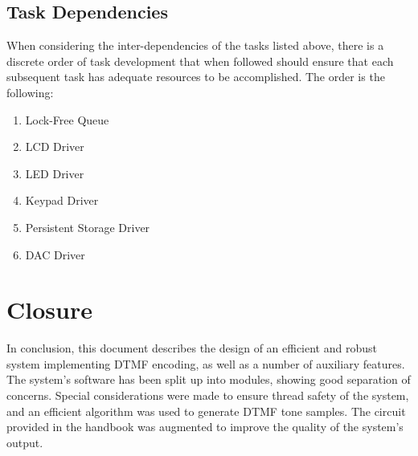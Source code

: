 \documentclass[11pt,a4paper,twocolumn]{scrartcl}
\begin{document}
\subsection{Task Dependencies}
When considering the inter-dependencies of the tasks listed above, there is a discrete order of task development that when followed should ensure that each subsequent task has adequate resources to be accomplished. The order is the following:
\begin{enumerate}
    \item Lock-Free Queue
    \item LCD Driver
   \item LED Driver
   \item Keypad Driver
   \item Persistent Storage Driver
   \item DAC Driver
\end{enumerate}

\section{Closure}

In conclusion, this document describes the design of an efficient and robust system implementing DTMF encoding, as well as a number of auxiliary features. The system's software has been split up
into modules, showing good separation of concerns. Special considerations were made to ensure thread safety of the system, and an efficient algorithm was used to generate DTMF tone samples. The circuit provided in the handbook was augmented to improve the quality of the system's output. 



\end{document}
